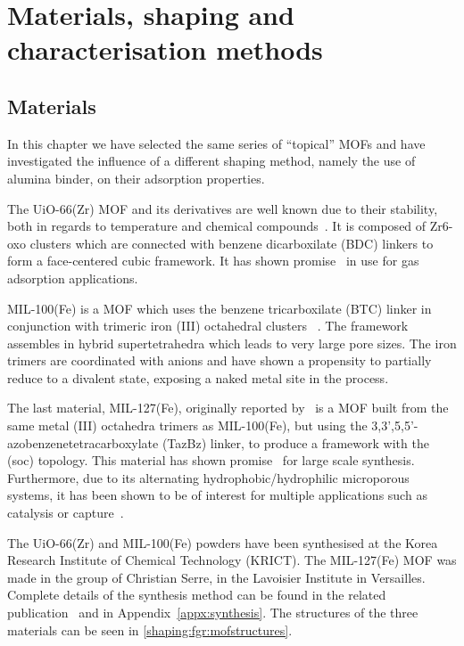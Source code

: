 
\section{Materials, shaping and characterisation methods}

\subsection{Materials}

In this chapter we have selected the same series of ``topical'' MOFs and 
have investigated the influence of a different shaping method, namely 
the use of alumina binder, on their adsorption properties.

The UiO-66(Zr) MOF and its derivatives are well known due to their 
stability, both in regards to temperature and chemical 
compounds~\cite{cavkaNewZirconiumInorganic2008}. It is composed of
Zr6-oxo clusters which are connected with benzene dicarboxilate 
(BDC) linkers to form a face-centered cubic framework. It has 
shown promise~\cite{wiersumEvaluationUiO66GasBased2011}
in use for gas adsorption applications.

MIL-100(Fe) is a MOF which uses the benzene tricarboxilate (BTC) linker 
in conjunction with trimeric iron (III) octahedral clusters
~\cite{horcajadaSynthesisCatalyticProperties2007,
YangWaterStableMetalOrganic2013}.
The framework assembles in hybrid supertetrahedra which leads to very 
large pore sizes. The iron trimers are coordinated with
anions and have shown a propensity to partially reduce to a divalent 
 state, exposing a naked metal site in the process.
~\cite{yoonControlledReducibilityMetalOrganic2010}

The last material, MIL-127(Fe), originally reported 
by~\citeauthor{liuAssemblyMetalOrganic2007} is a MOF built from the same
metal (III) octahedra trimers as MIL-100(Fe), but using the
3,3',5,5'-azobenzenetetracarboxylate (TazBz) linker, to produce a 
framework with the (soc) topology. This material has shown 
promise~\cite{chevreauSynthesisBiocompatibleHighly2016}
for large scale synthesis. Furthermore, due to its alternating
hydrophobic/hydrophilic microporous systems, it has been shown to be
of interest for multiple applications such as catalysis or 
 capture~\cite{chanutScreeningEffectWater2017}.

The UiO-66(Zr) and MIL-100(Fe) powders have been synthesised at the
Korea Research Institute of Chemical Technology (KRICT).
The MIL-127(Fe) MOF was made in the group of Christian Serre,
in the Lavoisier Institute in Versailles.
Complete details of the synthesis method can be found in the related
publication~\cite{valekarShapingPorousMetal2017}
and in Appendix~\ref{appx:synthesis}.
The structures of the three materials can be seen 
in \autoref{shaping:fgr:mofstructures}.


